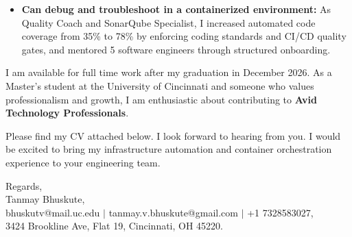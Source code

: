 \documentclass[11pt]{letter}
\begin{document}
\begin{letter}{}
\begin{itemize}[leftmargin=*, itemsep=0.45em]
    \item \textbf{Can debug and troubleshoot in a containerized environment:} As Quality Coach and SonarQube Specialist, I increased automated code coverage from 35\% to 78\% by enforcing coding standards and CI/CD quality gates, and mentored 5 software engineers through structured onboarding.
\end{itemize}

I am available for full time work after my graduation in December 2026. As a Master's student at the University of Cincinnati and someone who values professionalism and growth, I am enthusiastic about contributing to \textbf{Avid Technology Professionals}.

Please find my CV attached below. I look forward to hearing from you. I would be excited to bring my infrastructure automation and container orchestration experience to your engineering team.

{\setlength{\parskip}{0pt}
Regards,\\
Tanmay Bhuskute,\\
bhuskutv@mail.uc.edu $\mid$ tanmay.v.bhuskute@gmail.com $\mid$ +1 7328583027,\\
3424 Brookline Ave, Flat 19, Cincinnati, OH 45220.
}

\end{letter}
\end{document}
